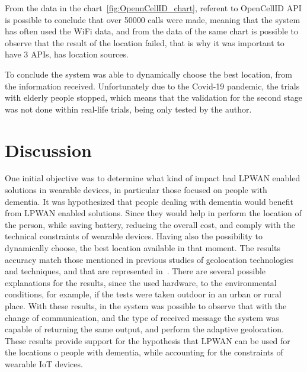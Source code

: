 From the data  in the chart~\ref{fig:OpennCellID_chart}, referent to OpenCellID API is possible to conclude that over 50000 calls were made, meaning that the system has often used the WiFi data, and from the data of the same chart is possible to observe that the result of the location failed, that is why it was important to have 3 APIs, has location sources.

To conclude the system was able to dynamically choose the best location, from the information received. Unfortunately due to the Covid-19 pandemic, the trials with elderly people stopped, which means that the validation for the second stage was not done within real-life trials, being only tested by the author.


\section{Discussion}
\label{sec:Discussion}

One initial objective was to  determine what kind of impact had LPWAN enabled solutions in wearable devices, in particular those focused on people with dementia.\newline 
It was hypothesized that people dealing with dementia would benefit from LPWAN enabled solutions. Since they would help in perform the location of the person, while saving battery, reducing the overall cost, and comply with the technical constraints of wearable devices. Having also the possibility to dynamically choose, the best location available in that moment. \newline 
The results accuracy match those mentioned in previous studies of geolocation technologies and techniques, and that are represented in~.\newline 
There are several possible explanations for the results, since the used hardware, to the environmental conditions, for example, if the tests were taken outdoor in an urban or rural place. \newline 
With these results, in the system  was possible to observe that with the change of communication, and the type of received message the system was capable of returning the same output, and perform the adaptive geolocation.\newline 
These results provide support for the hypothesis that LPWAN can be used for the locations o people with dementia, while accounting for the constraints of wearable IoT devices.




